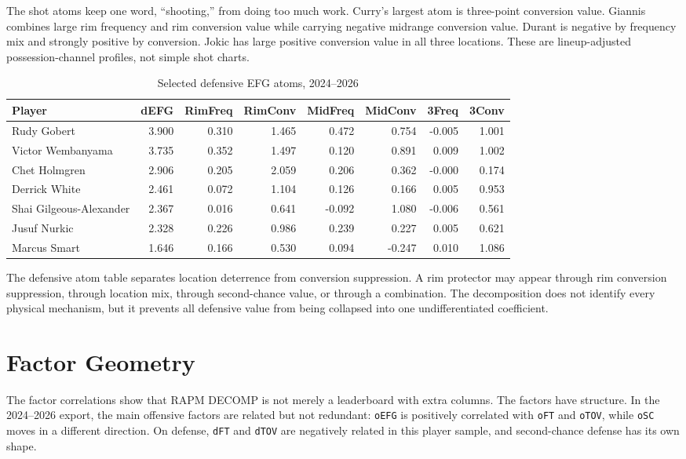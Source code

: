 \documentclass[11pt]{article}
\begin{document}
The shot atoms keep one word, ``shooting,'' from doing too much work.  Curry's
largest atom is three-point conversion value.  Giannis combines large rim
frequency and rim conversion value while carrying negative midrange conversion
value.  Durant is negative by frequency mix and strongly positive by conversion.
Jokic has large positive conversion value in all three locations.  These are
lineup-adjusted possession-channel profiles, not simple shot charts.

\begin{table}[h]
\centering
\caption{Selected defensive EFG atoms, 2024--2026}
\label{tab:defshot}
\begin{tabular}{lrrrrrrr}
\toprule
Player & dEFG & RimFreq & RimConv & MidFreq & MidConv & 3Freq & 3Conv\\
\midrule
Rudy Gobert & 3.900 & 0.310 & 1.465 & 0.472 & 0.754 & -0.005 & 1.001\\
Victor Wembanyama & 3.735 & 0.352 & 1.497 & 0.120 & 0.891 & 0.009 & 1.002\\
Chet Holmgren & 2.906 & 0.205 & 2.059 & 0.206 & 0.362 & -0.000 & 0.174\\
Derrick White & 2.461 & 0.072 & 1.104 & 0.126 & 0.166 & 0.005 & 0.953\\
Shai Gilgeous-Alexander & 2.367 & 0.016 & 0.641 & -0.092 & 1.080 & -0.006 & 0.561\\
Jusuf Nurkic & 2.328 & 0.226 & 0.986 & 0.239 & 0.227 & 0.005 & 0.621\\
Marcus Smart & 1.646 & 0.166 & 0.530 & 0.094 & -0.247 & 0.010 & 1.086\\
\bottomrule
\end{tabular}
\end{table}

The defensive atom table separates location deterrence from conversion
suppression.  A rim protector may appear through rim conversion suppression,
through location mix, through second-chance value, or through a combination.
The decomposition does not identify every physical mechanism, but it prevents
all defensive value from being collapsed into one undifferentiated coefficient.

\section{Factor Geometry}

The factor correlations show that RAPM DECOMP is not merely a leaderboard with
extra columns.  The factors have structure.  In the 2024--2026 export, the main
offensive factors are related but not redundant: \texttt{oEFG} is positively
correlated with \texttt{oFT} and \texttt{oTOV}, while \texttt{oSC} moves in a
different direction.  On defense, \texttt{dFT} and \texttt{dTOV} are negatively
related in this player sample, and second-chance defense has its own shape.
\end{document}

